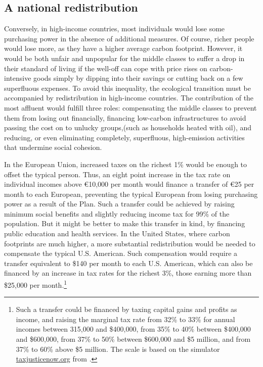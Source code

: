 \documentclass[a5paper,english,openany]{memoir}
\begin{document}
\subsection{A national redistribution} %
Conversely, %
in high-income countries, most individuals would lose some %
purchasing power in the absence of additional measures. Of course, richer people would lose more, as they have a higher average carbon footprint. However, it would be both unfair and unpopular for the middle classes to suffer a drop in their standard of living if the well-off can cope with price rises on carbon-intensive goods simply by dipping into their savings or cutting back on a few superfluous expenses. To avoid this inequality, the ecological transition %
must be accompanied by redistribution in high-income countries. The contribution of the most affluent would fulfill %
three roles: compensating the middle classes to prevent them from losing out financially, financing low-carbon infrastructures to avoid passing the cost on to unlucky groups,(such as households heated with oil), %
and reducing, or even eliminating completely, %
superfluous, high-emission activities that undermine social cohesion.

In the European Union, increased taxes on the richest 1\% would be enough to offset the typical person. %
Thus, an  eight point %
increase in the tax rate on individual incomes above \euro{}10,000 per month would finance a transfer of \euro{}25 per month to each European, preventing the typical European from losing purchasing power as a result of the Plan. Such a transfer could be achieved by raising minimum social benefits and slightly reducing income tax for 99\% of the population. But it might be better to make this transfer in kind, by financing public education and health services. In the United States, where carbon footprints are much higher, a more substantial redistribution would be needed to compensate the typical U.S. American. Such compensation would require a transfer equivalent to \$140 per month to each U.S. American, which can also be financed by an increase in tax rates for the richest 3\%, those earning more than \$25,000 per month.\footnote{Such a transfer could be financed by taxing capital gains and profits as income, and raising the marginal tax rate from 32\% to 33\% for annual incomes between 315,000 and \$400,000, from 35\% to 40\% between \$400,000 and \$600,000, from 37\% to 50\% between \$600,000 and \$5 million, and from 37\% to 60\% above \$5 million. The scale is based on the simulator \href{https://taxjusticenow.org/}{taxjusticenow.org} from \cite{saez_triumph_2019}.}%
\end{document}
